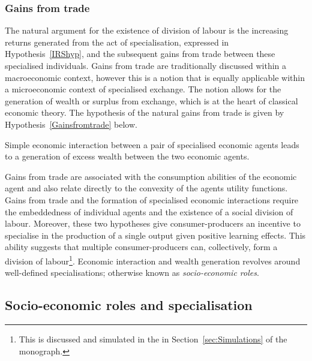 \subsubsection{Gains from trade}

The natural argument for the existence of division of labour is the increasing returns generated from the act of specialisation, expressed in Hypothesis~\ref{IRShyp}, and the subsequent gains from trade between these specialised individuals. Gains from trade are traditionally discussed within a macroeconomic context, however this is a notion that is equally applicable within a microeconomic context of specialised exchange. The notion allows for the generation of wealth or surplus from exchange, which is at the heart of classical economic theory. The hypothesis of the natural gains from trade is given by Hypothesis~\ref{Gainsfromtrade} below.

\begin{hypothesis} \label{Gainsfromtrade}
Simple economic interaction between a pair of specialised economic agents leads to a generation of excess wealth between the two economic agents.
\end{hypothesis}

Gains from trade are associated with the consumption abilities of the economic agent and also relate directly to the convexity of the agents utility functions. Gains from trade and the formation of specialised economic interactions require the embeddedness of individual agents and the existence of a social division of labour. Moreover, these two hypotheses give consumer-producers an incentive to specialise in the production of a single output given positive learning effects. This ability suggests that multiple consumer-producers can, collectively, form a division of labour\footnote{This is discussed and simulated in the in Section~\ref{sec:Simulations} of the monograph.}. Economic interaction and wealth generation revolves around well-defined specialisations; otherwise known as \emph{socio-economic roles}.

\subsection{Socio-economic roles and specialisation}
\label{subsec:socio-economic roles}

